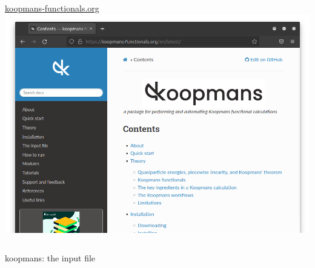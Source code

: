 \documentclass[xcolor=table,aspectratio=169]{beamer}
\numberwithin{equation}{section}
\begin{document}
\begin{frame}{}
\begin{columns}
      \begin{column}{0.4\textwidth}
         \centering
         \url{koopmans-functionals.org}
         \includegraphics[width=\columnwidth]{figures/website_cropped.png}
      \end{column}
   \end{columns}
\end{frame}

\begin{frame}{koopmans: the input file}
   \begin{minipage}[t]{0.475\columnwidth}
      \inputminted[fontsize=\tiny,breaklines,lastline=20]{json}{scripts/si.json}
   \end{minipage}
   \hspace{0.025\textwidth}
   \begin{minipage}[t]{0.475\columnwidth}
      \inputminted[fontsize=\tiny,breaklines,firstline=21]{json}{scripts/si.json}
   \end{minipage}
\end{frame}

\end{document}

